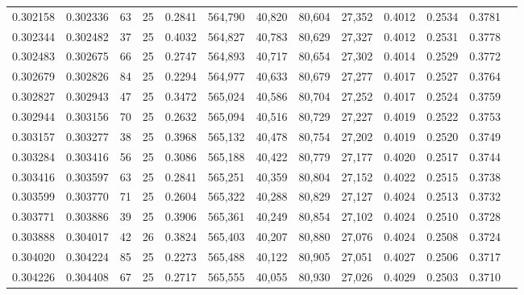 \begin{tabular}{rrrrrrrrrrrrr}
0.302158 & 0.302336 &    63 &  25 &                                     0.2841 & 564,790 &  40,820 &  80,604 &  27,352 & 0.4012 & 0.2534 & 0.3781 \\
0.302344 & 0.302482 &    37 &  25 &                                     0.4032 & 564,827 &  40,783 &  80,629 &  27,327 & 0.4012 & 0.2531 & 0.3778 \\
0.302483 & 0.302675 &    66 &  25 &                                     0.2747 & 564,893 &  40,717 &  80,654 &  27,302 & 0.4014 & 0.2529 & 0.3772 \\
0.302679 & 0.302826 &    84 &  25 &                                     0.2294 & 564,977 &  40,633 &  80,679 &  27,277 & 0.4017 & 0.2527 & 0.3764 \\
0.302827 & 0.302943 &    47 &  25 &                                     0.3472 & 565,024 &  40,586 &  80,704 &  27,252 & 0.4017 & 0.2524 & 0.3759 \\
0.302944 & 0.303156 &    70 &  25 &                                     0.2632 & 565,094 &  40,516 &  80,729 &  27,227 & 0.4019 & 0.2522 & 0.3753 \\
0.303157 & 0.303277 &    38 &  25 &                                     0.3968 & 565,132 &  40,478 &  80,754 &  27,202 & 0.4019 & 0.2520 & 0.3749 \\
0.303284 & 0.303416 &    56 &  25 &                                     0.3086 & 565,188 &  40,422 &  80,779 &  27,177 & 0.4020 & 0.2517 & 0.3744 \\
0.303416 & 0.303597 &    63 &  25 &                                     0.2841 & 565,251 &  40,359 &  80,804 &  27,152 & 0.4022 & 0.2515 & 0.3738 \\
0.303599 & 0.303770 &    71 &  25 &                                     0.2604 & 565,322 &  40,288 &  80,829 &  27,127 & 0.4024 & 0.2513 & 0.3732 \\
0.303771 & 0.303886 &    39 &  25 &                                     0.3906 & 565,361 &  40,249 &  80,854 &  27,102 & 0.4024 & 0.2510 & 0.3728 \\
0.303888 & 0.304017 &    42 &  26 &                                     0.3824 & 565,403 &  40,207 &  80,880 &  27,076 & 0.4024 & 0.2508 & 0.3724 \\
0.304020 & 0.304224 &    85 &  25 &                                     0.2273 & 565,488 &  40,122 &  80,905 &  27,051 & 0.4027 & 0.2506 & 0.3717 \\
0.304226 & 0.304408 &    67 &  25 &                                     0.2717 & 565,555 &  40,055 &  80,930 &  27,026 & 0.4029 & 0.2503 & 0.3710 \\

\end{tabular}

